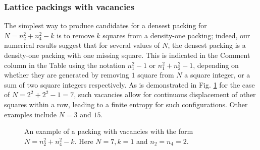 \documentclass{umthesis}          %
\begin{document}
\subsubsection{Lattice packings with vacancies}
\label{sec:vacancies}
The simplest way to produce candidates for a densest packing for $N=n_2^2 + n_4^2-k$ is to remove $k$ squares from a density-one packing; indeed, our numerical results suggest that for several values of $N$, the densest packing is a density-one packing with one missing square.  This is indicated in the Comment column in the Table using the notation $n_1^2-1$ or $n_1^2+ n_2^2-1$, depending on whether they are generated by removing $1$ square from $N$ a square integer, or a sum of two square integers respectively.  As is demonstrated in Fig. \ref{fig:n7} for the case of $N=2^2+2^2-1=7$, such vacancies allow for continuous displacement of other squares within a row, leading to a finite entropy for such configurations.  Other examples include $N=3$ and $15$.

\begin{figure}[H]
\caption{\label{fig:n7} An example of a packing with vacancies with the form $N=n_2^2 + n_4^2-k$. Here $N=7, k=1$ and $n_2=n_4=2$.}
\end{figure}
\end{document}
